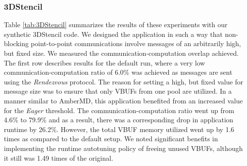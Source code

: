 \begin{table}[!tbp]
  \centering
  \small
  \captionsetup{justification=centering}
  \caption{SNAP: Impact of Eager threshold and autotuning on execution time and memory usage}
  \label{tab:SNAP}
\end{table}
\subsubsection{3DStencil}
Table \ref{tab:3DStencil} summarizes the results of these experiments with our synthetic 3DStencil code. We designed the application in such a way that non-blocking point-to-point communications involve messages of an arbitrarily high, but fixed size. We measured the communication-computation overlap achieved. The first row describes results for the default run, where a very low communication-computation ratio of 6.0\% was achieved as messages are sent using the \emph{Rendezvous} protocol. The reason for setting a high, but fixed value for message size was to ensure that only VBUFs from one pool are utilized. In a manner similar to AmberMD, this application benefited from an increased value for the \emph{Eager} threshold. The communication-computation ratio went up from 4.6\% to 79.9\% and as a result, there was a corresponding drop in application runtime by 26.2\%. However, the total VBUF memory utilized went up by 1.6 times as compared to the default setup. We noted significant benefits in implementing the runtime autotuning policy of freeing unused VBUFs, although it still was 1.49 times of the original. \par

